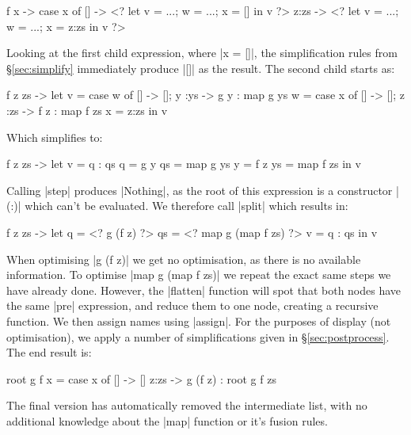 \documentclass[draft]{sigplanconf}
\begin{document}
\begin{code}
\g f x -> case  x of
                []    -> <? let v = ...; w = ...; x = []    in v ?>
                z:zs  -> <? let v = ...; w = ...; x = z:zs  in v ?>
\end{code}

Looking at the first child expression, where |x = []|, the simplification rules from \S\ref{sec:simplify} immediately produce |[]| as the result. The second child starts as:

\begin{code}
\g f z zs ->
    let  v  = case  w  of [] -> []; y  :ys  -> g  y  : map g  ys
         w  = case  x  of [] -> []; z  :zs  -> f  z  : map f  zs
         x  = z:zs
    in   v
\end{code}

Which simplifies to:

\begin{code}
\g f z zs ->  let  v   = q : qs
                   q   = g y
                   qs  = map g ys
                   y   = f z
                   ys  = map f zs
              in   v
\end{code}

Calling |step| produces |Nothing|, as the root of this expression is a constructor |(:)| which can't be evaluated. We therefore call |split| which results in:

\begin{code}
\g f z zs ->  let  q   = <? g (f z) ?>
                   qs  = <? map g (map f zs) ?>
                   v   = q : qs
              in   v
\end{code}

When optimising |g (f z)| we get no optimisation, as there is no available information. To optimise |map g (map f zs)| we repeat the exact same steps we have already done. However, the |flatten| function will spot that both nodes have the same |pre| expression, and reduce them to one node, creating a recursive function. We then assign names using |assign|. For the purposes of display (not optimisation), we apply a number of simplifications given in \S\ref{sec:postprocess}. The end result is:

\begin{code}
root g f x = case  x of
                   []    -> []
                   z:zs  -> g (f z) : root g f zs
\end{code}

The final version has automatically removed the intermediate list, with no additional knowledge about the |map| function or it's fusion rules.
\end{document}
